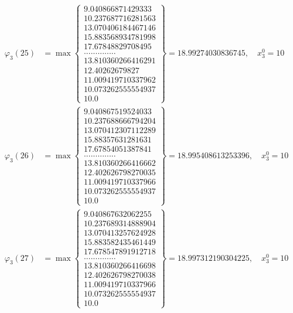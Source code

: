 \documentclass{article}
\begin{document}
\begin{align*}
  
  
  
\varphi_{3}(25) &= \max \left\{ \begin{array}{c}
9.040866871429333 \\
 10.237687716281563 \\
 13.070406184467146 \\
 15.883568934781998 \\
 17.67848829708495 \\
 .............. \\
 13.810360266416291 \\
 12.40262679827 \\
 11.009419710337962 \\
 10.073262555554937 \\
 10.0
\end{array} \right\} = 18.99274030836745, \quad x_{3}^0 = 10\\
  
  
  
  
\varphi_{3}(26) &= \max \left\{ \begin{array}{c}
9.040867519524033 \\
 10.237688666794204 \\
 13.070412307112289 \\
 15.88357631281631 \\
 17.67854051387841 \\
 .............. \\
 13.810360266416662 \\
 12.402626798270035 \\
 11.009419710337966 \\
 10.073262555554937 \\
 10.0
\end{array} \right\} = 18.995408613253396, \quad x_{3}^0 = 10\\
  
  
  
  
\varphi_{3}(27) &= \max \left\{ \begin{array}{c}
9.040867632062255 \\
 10.237689314888904 \\
 13.070413257624928 \\
 15.883582435461449 \\
 17.678547891912718 \\
 .............. \\
 13.810360266416698 \\
 12.402626798270038 \\
 11.009419710337966 \\
 10.073262555554937 \\
 10.0
\end{array} \right\} = 18.997312190304225, \quad x_{3}^0 = 10\\
  

\end{align*}
\end{document}
